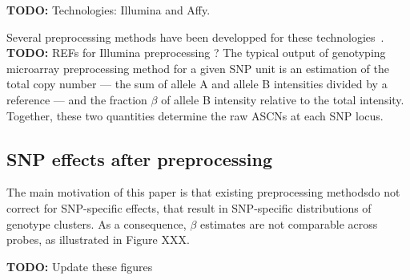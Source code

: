 \documentclass[10pt]{bmc_article}
\newenvironment{bmcformat}{\fussy\setboolean{publ}{true}}{\fussy}
\newenvironment{TODO}{\color{red}\textbf{TODO:}}{}
\begin{document}
\begin{bmcformat}
\begin{TODO}
  Technologies: Illumina and Affy.
\end{TODO}

Several preprocessing methods have been developped for these technologies~\cite{Affymetrix_2008m,BengtssonH_etal_2009b,BengtssonH_etal_2008,KornJ_etal_2008,LiWong_2001}.
\begin{TODO}
  REFs for Illumina preprocessing ?
\end{TODO}
The typical output of genotyping microarray preprocessing method for a given SNP unit is an estimation of the total copy number --- the sum of allele A and allele B intensities divided by a reference --- and the fraction $\beta$ of allele B intensity relative to the total intensity. Together, these two quantities determine the raw ASCNs at each SNP locus.

\subsection*{SNP effects after preprocessing}

The main motivation of this paper is that existing preprocessing methodsdo not correct for SNP-specific effects, that result in SNP-specific distributions of genotype clusters. As a consequence, $\beta$ estimates are not comparable across probes, as illustrated in Figure XXX. 

\begin{TODO}
Update these figures
\end{TODO}



\end{bmcformat}
\end{document}
